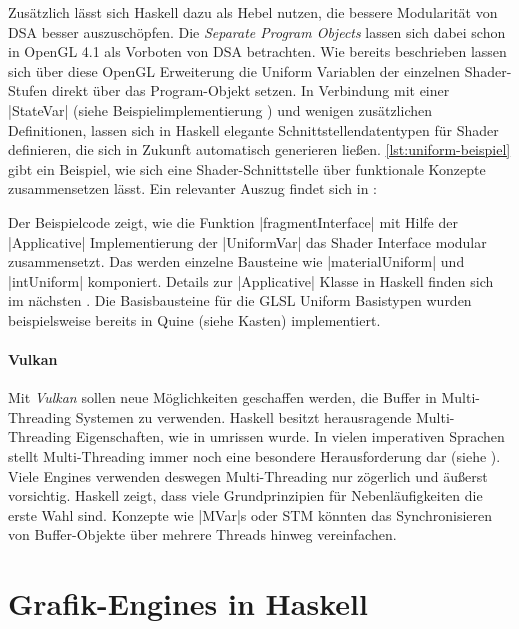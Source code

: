 Zusätzlich lässt sich Haskell dazu als Hebel nutzen, die bessere Modularität von \ac{DSA} besser auszuschöpfen. Die \textit{Separate Program Objects} lassen sich dabei schon in OpenGL 4.1 als Vorboten von \ac{DSA} betrachten. Wie bereits beschrieben lassen sich über diese OpenGL Erweiterung die Uniform Variablen der einzelnen Shader-Stufen direkt über das Program-Objekt setzen. In Verbindung mit einer |StateVar| (siehe Beispielimplementierung ) und wenigen zusätzlichen Definitionen, lassen sich in Haskell elegante Schnittstellendatentypen für Shader definieren, die sich in Zukunft automatisch generieren ließen. \ref{lst:uniform-beispiel} gibt ein Beispiel, wie sich eine Shader-Schnittstelle über funktionale Konzepte zusammensetzen lässt. Ein relevanter Auszug findet sich in :

\endgroup

Der Beispielcode zeigt, wie die Funktion |fragmentInterface| mit Hilfe der |Applicative| Implementierung der |UniformVar| das Shader Interface modular zusammensetzt. Das werden einzelne Bausteine wie |materialUniform| und |intUniform| komponiert. Details zur |Applicative| Klasse in Haskell finden sich im nächsten . Die Basisbausteine für die GLSL Uniform Basistypen wurden beispielsweise bereits in Quine (siehe Kasten) implementiert.


\paragraph{Vulkan} Mit \textit{Vulkan} sollen neue Möglichkeiten geschaffen werden, die Buffer in Multi-Threading Systemen zu verwenden. Haskell besitzt herausragende Multi-Threading Eigenschaften, wie in  umrissen wurde. In vielen imperativen Sprachen stellt Multi-Threading immer noch eine besondere Herausforderung dar (siehe ). Viele Engines verwenden deswegen Multi-Threading nur zögerlich und äußerst vorsichtig. Haskell zeigt, dass viele Grundprinzipien für Nebenläufigkeiten die erste Wahl sind. Konzepte wie |MVar|s oder \ac{STM} könnten das Synchronisieren von Buffer-Objekte über mehrere Threads hinweg vereinfachen.

\section{Grafik-Engines in Haskell}

